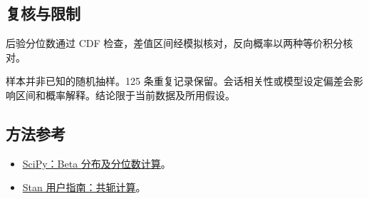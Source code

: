 \documentclass[UTF8,a4paper,11pt,fontset=fandol]{ctexart}
\begin{document}
\subsection*{复核与限制}
后验分位数通过 CDF 检查，差值区间经模拟核对，反向概率以两种等价积分核对。

样本并非已知的随机抽样。125 条重复记录保留。会话相关性或模型设定偏差会影响区间和概率解释。结论限于当前数据及所用假设。
\subsection*{方法参考}
\begin{itemize}
\item \href{https://docs.scipy.org/doc/scipy/reference/generated/scipy.stats.beta.html}{SciPy：Beta 分布及分位数计算}。

\item \href{https://mc-stan.org/docs/stan-users-guide/efficiency-tuning.html\#exploiting-conjugacy}{Stan 用户指南：共轭计算}。
\end{itemize}
\end{document}
